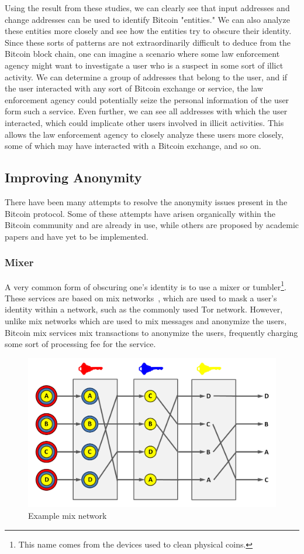 \documentclass[11pt]{article}
\begin{document}
Using the result from these studies, we can clearly see that input addresses and
change addresses can be used to identify Bitcoin "entities." We can also analyze
these entities more closely and see how the entities try to obscure their
identity. Since these sorts of patterns are not extraordinarily difficult to
deduce from the Bitcoin block chain, one can imagine a scenario where some law
enforcement agency might want to investigate a user who is a suspect in some
sort of illict activity. We can determine a group of addresses that belong to
the user, and if the user interacted with any sort of Bitcoin exchange or
service, the law enforcement agency could potentially seize the personal
information of the user form such a service. Even further, we can see all
addresses with which the user interacted, which could implicate other users
involved in illicit activities. This allows the law enforcement agency to
closely analyze these users more closely, some of which may have interacted with
a Bitcoin exchange, and so on.

\subsection{Improving Anonymity}
There have been many attempts to resolve the anonymity issues present in the
Bitcoin protocol. Some of these attempts have arisen organically within the
Bitcoin community and are already in use, while others are proposed by academic
papers and have yet to be implemented.

\subsubsection{Mixer}
A very common form of obscuring one's identity is to use a mixer or
tumbler\footnote{This name comes from the devices used to clean physical coins.}.
These services are based on mix networks~\cite{chaum81}, which are used to mask
a user's identity within a network, such as the commonly used Tor network.
However, unlike mix networks which are used to mix messages and anonymize the
users, Bitcoin mix services mix transactions to anonymize the users, frequently
charging some sort of processing fee for the service.

\begin{figure}[H]
    \caption{Example mix network\protect\footnotemark}
    \centering
    \includegraphics[width=.8\linewidth]{figures/mix.png}
\end{figure}
\end{document}

